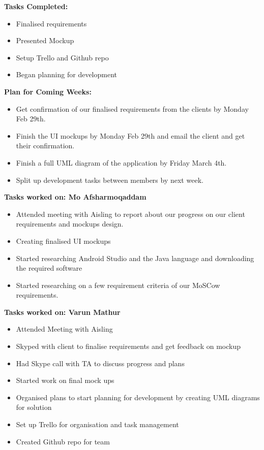 \documentclass[12pt]{article}
\begin{document}
\textbf{Tasks Completed:}
\begin{itemize}
\item Finalised requirements
\item  Presented Mockup
\item  Setup Trello and Github repo
\item  Began planning for development
\end{itemize}
\bigskip

\textbf{Plan for Coming Weeks:}
\begin{itemize}
\item  Get confirmation of our finalised requirements from the clients by Monday Feb 29th.
\item  Finish the UI mockups by Monday Feb 29th and email the client and get their confirmation.
\item  Finish a full UML diagram of the application by Friday March 4th. 
\item  Split up development tasks between members by next week. 
\end{itemize}
\bigskip

\textbf{Tasks worked on: Mo Afsharmoqaddam}
\begin{itemize}
\item Attended meeting with Aisling to report about our progress on our client requirements and mockups design.
\item Creating finalised UI mockups 
\item Started researching Android Studio and the Java language and downloading the required software
\item Started researching on a few requirement criteria of our MoSCow requirements. 
\end{itemize}
\bigskip

\textbf{Tasks worked on: Varun Mathur}
\begin{itemize}
\item Attended Meeting with Aisling
\item Skyped with client to finalise requirements and get feedback on mockup
\item Had Skype call with TA to discuss progress and plans
\item Started work on final mock ups
\item Organised plans to start planning for development by creating UML diagrams for solution
\item Set up Trello for organisation and task management
\item Created Github repo for team
\end{itemize}
\end{document}
